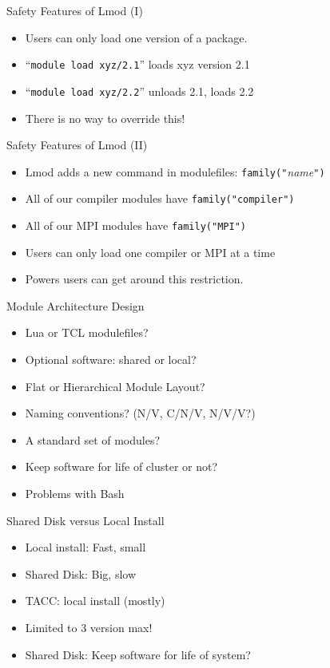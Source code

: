 \documentclass[dvipsnames,aspectratio=169]{beamer}
\begin{document}
\begin{frame}{Safety Features of Lmod (I)}
  \begin{itemize}
    \item Users can only load one version of a package.
    \item ``\texttt{module load xyz/2.1}'' loads xyz version 2.1
    \item ``\texttt{module load xyz/2.2}'' unloads 2.1, loads 2.2
    \item There is no way to override this!
  \end{itemize}
\end{frame}

\begin{frame}{Safety Features of Lmod (II)}
  \begin{itemize}
    \item Lmod adds a new command in modulefiles: \texttt{family("}\emph{name}\texttt{")}
    \item All of our compiler modules have \texttt{family("compiler")}
    \item All of our MPI modules have \texttt{family("MPI")}
    \item Users can only load one compiler or MPI at a time
    \item Powers users can get around this restriction.
  \end{itemize}
\end{frame}

\begin{frame}{Module Architecture Design}
  \begin{itemize}
    \item Lua or TCL modulefiles?
    \item Optional software: shared or local?
    \item Flat or Hierarchical Module Layout?
    \item Naming conventions? (N/V, C/N/V, N/V/V?)
    \item A standard set of modules?
    \item Keep software for life of cluster or not?
    \item Problems with Bash
  \end{itemize}
\end{frame}

\begin{frame}{Shared Disk versus Local Install}
  \begin{itemize}
    \item Local install: Fast, small 
    \item Shared Disk: Big, slow
    \item TACC: local install (mostly)
    \item Limited to 3 version max!
    \item Shared Disk: Keep software for life of system?
  \end{itemize}
\end{frame}
\end{document}
